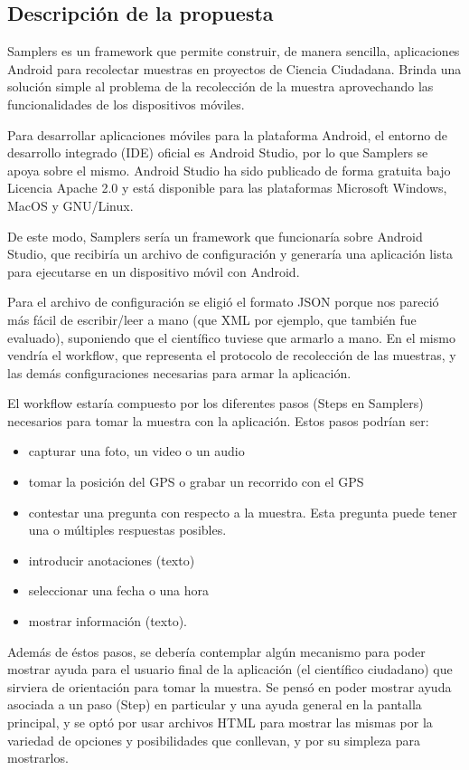 \subsection{Descripción de la propuesta}
Samplers es un framework que permite construir, de manera sencilla, aplicaciones Android para recolectar muestras en proyectos de Ciencia Ciudadana. Brinda una solución simple al problema de la recolección de la muestra aprovechando las funcionalidades de los dispositivos móviles.


Para desarrollar aplicaciones móviles para la plataforma Android, el entorno de desarrollo integrado (IDE) oficial es Android Studio\cite{androidStudio}, por lo que Samplers se apoya sobre el mismo. Android Studio ha sido publicado de forma gratuita bajo Licencia Apache 2.0 y está disponible para las plataformas Microsoft Windows, MacOS y GNU/Linux.

De este modo, Samplers sería un framework que funcionaría sobre Android Studio, que recibiría un archivo de configuración y generaría una aplicación lista para ejecutarse en un dispositivo móvil con Android.

Para el archivo de configuración se eligió el formato JSON porque nos pareció más fácil de escribir/leer a mano (que XML por ejemplo, que también fue evaluado), suponiendo que el científico tuviese que armarlo a mano. En el mismo vendría el workflow, que representa el protocolo de recolección de las muestras, y las demás configuraciones necesarias para armar la aplicación.

El workflow estaría compuesto por los diferentes pasos (Steps en Samplers) necesarios para tomar la muestra con la aplicación. Estos pasos podrían ser:
\begin{itemize}
\item capturar una foto, un video o un audio
\item tomar la posición del GPS o grabar un recorrido con el GPS
\item contestar una pregunta con respecto a la muestra. Esta pregunta puede tener una o múltiples respuestas posibles.
\item introducir anotaciones (texto)
\item seleccionar una fecha o una hora
\item mostrar información (texto).
\end{itemize}

Además de éstos pasos, se debería contemplar algún mecanismo para poder mostrar ayuda para el usuario final de la aplicación (el científico ciudadano) que sirviera de orientación para tomar la muestra. Se pensó en poder mostrar ayuda asociada a un paso (Step) en particular y una ayuda general en la pantalla principal, y se optó por usar archivos HTML para mostrar las mismas por la variedad de opciones y posibilidades que conllevan, y por su simpleza para mostrarlos.

